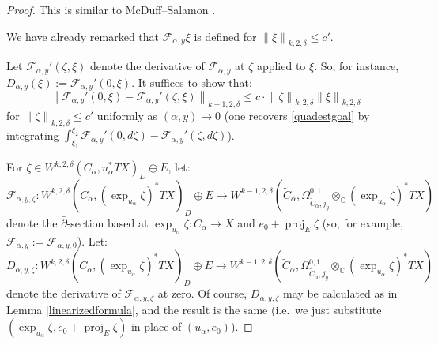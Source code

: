 \documentclass[12pt]{article}
\theoremstyle{definition}
\theoremstyle{remark}
\numberwithin{equation}{subsection}
\newcommand{\F}{\mathcal F}
\newcommand{\CC}{\mathbb C}
\newcommand{\proj}{\operatorname{proj}}
\newcommand{\delbar}{\bar\partial}
\begin{document}
\begin{proof}
This is similar to McDuff--Salamon \cite[p68, Proposition 3.5.3]{mcduffsalamonJholsymp}.

We have already remarked that $\F_{\alpha,y}\xi$ is defined for $\left\|\xi\right\|_{k,2,\delta}\leq c'$.

Let $\F_{\alpha,y}'(\zeta,\xi)$ denote the derivative of $\F_{\alpha,y}$ at $\zeta$ applied to $\xi$.  So, for instance, $D_{\alpha,y}(\xi):=\F_{\alpha,y}'(0,\xi)$.  It suffices to show that:
\begin{equation}\label{derivislip}
\left\|\F_{\alpha,y}'(0,\xi)-\F_{\alpha,y}'(\zeta,\xi)\right\|_{k-1,2,\delta}\leq c\cdot\left\|\zeta\right\|_{k,2,\delta}\left\|\xi\right\|_{k,2,\delta}
\end{equation}
for $\left\|\zeta\right\|_{k,2,\delta}\leq c'$ uniformly as $(\alpha,y)\to 0$ (one recovers \eqref{quadestgoal} by integrating $\int_{\xi_1}^{\xi_2}\F_{\alpha,y}'(0,d\zeta)-\F_{\alpha,y}'(\zeta,d\zeta)$).

For $\zeta\in W^{k,2,\delta}(C_\alpha,u_\alpha^\ast TX)_D\oplus E$, let:
\begin{equation}
\F_{\alpha,y,\zeta}:W^{k,2,\delta}(C_\alpha,(\exp_{u_\alpha}\zeta)^\ast TX)_D\oplus E\to W^{k-1,2,\delta}(\tilde C_\alpha,\Omega^{0,1}_{\tilde C_\alpha,j_y}\otimes_\CC(\exp_{u_\alpha}\zeta)^\ast TX)
\end{equation}
denote the $\delbar$-section based at $\exp_{u_\alpha}\zeta:C_\alpha\to X$ and $e_0+\proj_E\zeta$ (so, for example, $\F_{\alpha,y}:=\F_{\alpha,y,0}$).  Let:
\begin{equation}
D_{\alpha,y,\zeta}:W^{k,2,\delta}(C_\alpha,(\exp_{u_\alpha}\zeta)^\ast TX)_D\oplus E\to W^{k-1,2,\delta}(\tilde C_\alpha,\Omega^{0,1}_{\tilde C_\alpha,j_y}\otimes_\CC(\exp_{u_\alpha}\zeta)^\ast TX)
\end{equation}
denote the derivative of $\F_{\alpha,y,\zeta}$ at zero.  Of course, $D_{\alpha,y,\zeta}$ may be calculated as in Lemma \ref{linearizedformula}, and the result is the same (i.e.\ we just substitute $(\exp_{u_\alpha}\zeta,e_0+\proj_E\zeta)$ in place of $(u_\alpha,e_0)$).


\end{proof}
\end{document}
